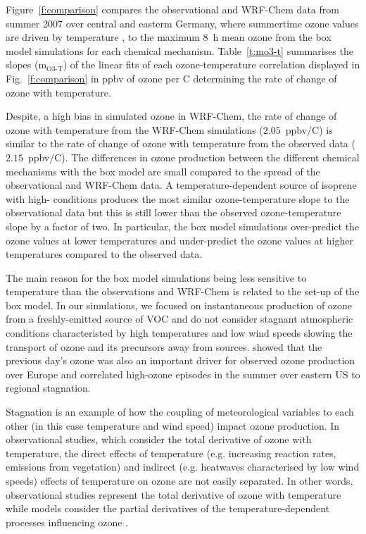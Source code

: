 Figure~\ref{f:comparison} compares the observational and WRF-Chem data from summer 2007 over central and easterm Germany, where summertime ozone values are driven by temperature \citep{Otero:2016}, to the maximum 8~h mean ozone from the box model simulations for each chemical mechanism.
Table~\ref{t:mo3-t} summarises the slopes (m$_{\text{O3-T}}$) of the linear fits of each ozone-temperature correlation displayed in Fig.~\ref{f:comparison} in ppbv of ozone per \degree C determining the rate of change of ozone with temperature.

Despite, a high bias in simulated ozone in WRF-Chem, the rate of change of ozone with temperature from the WRF-Chem simulations ($2.05$~ppbv/\degree C) is similar to the rate of change of ozone with temperature from the observed data ($2.15$~ppbv/\degree C).
The differences in ozone production between the different chemical mechanisms with the box model are small compared to the spread of the observational and WRF-Chem data.
A temperature-dependent source of isoprene with high- conditions produces the most similar ozone-temperature slope to the observational data but this is still lower than the observed ozone-temperature slope by a factor of two.
In particular, the box model simulations over-predict the ozone values at lower temperatures and under-predict the ozone values at higher temperatures compared to the observed data.

The main reason for the box model simulations being less sensitive to temperature than the observations and WRF-Chem is related to the set-up of the box model.
In our simulations, we focused on instantaneous production of ozone from a freshly-emitted source of VOC and do not consider stagnant atmospheric conditions characteristed by high temperatures and low wind speeds slowing the transport of ozone and its precursors away from sources.
\citet{Otero:2016} showed that the previous day's ozone was also an important driver for observed ozone production over Europe and \citet{Jacob:1993} correlated high-ozone episodes in the summer over eastern US to regional stagnation.

Stagnation is an example of how the coupling of meteorological variables to each other (in this case temperature and wind speed) impact ozone production.
In observational studies, which consider the total derivative of ozone with temperature, the direct effects of temperature (e.g. increasing reaction rates, emissions from vegetation) and indirect (e.g. heatwaves characterised by low wind speeds) effects of temperature on ozone are not easily separated.
In other words, observational studies represent the total derivative of ozone with temperature while models consider the partial derivatives of the temperature-dependent processes influencing ozone \citep{Rasmussen:2013}. 

